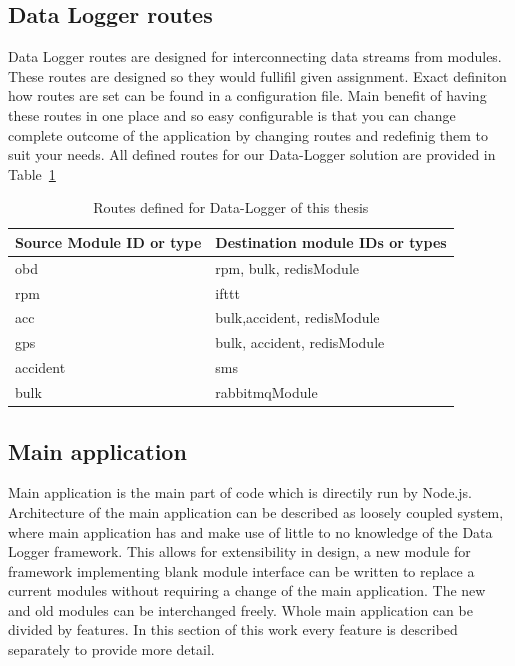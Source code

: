 \subsection{Data Logger routes} %
\label{sub:data_logger_routes}
Data Logger routes are designed for interconnecting data streams from modules. These routes are designed so they would fullifil given assignment. Exact definiton how routes are set can be found in a configuration file. Main benefit of having these routes in one place and so easy configurable is that you can change complete outcome of the application by changing routes and redefinig them to suit your needs. All defined routes for our Data-Logger solution are provided in Table~\ref{tab:tab6}
\begin{table}[H]
 \begin{center}
   \begin{tabular}{l l}
   Source Module ID or type & Destination module IDs or types\\
   \hline
   	obd & rpm, bulk, redisModule\\
    rpm & ifttt\\
    acc & bulk,accident, redisModule\\
    gps & bulk, accident, redisModule\\
    accident & sms\\
    bulk & rabbitmqModule\\
   \hline
   \end{tabular}
 \end{center}
 \caption{Routes defined for Data-Logger of this thesis}
 \label{tab:tab6}
\end{table}
\subsection{Main application} %
\label{sub:main_application}
Main application is the main part of code which is directily run by Node.js. Architecture of the main application can be described as loosely coupled system, where main application has and make use of little to no knowledge of the Data Logger framework. This allows for extensibility in design, a new module for framework implementing blank module interface can be written to replace a current modules without requiring a change of the main application. The new and old modules can be interchanged freely. Whole main application can be divided by features. In this section of this work every feature is described separately to provide more detail.
